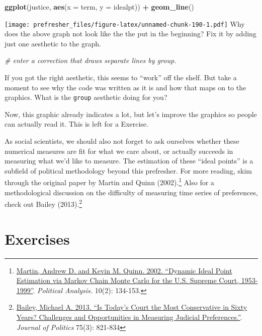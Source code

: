 \documentclass[]{book}
\newenvironment{Shaded}{\begin{snugshade}}{\end{snugshade}}
\newcommand{\CommentTok}[1]{\textcolor[rgb]{0.56,0.35,0.01}{\textit{#1}}}
\newcommand{\DataTypeTok}[1]{\textcolor[rgb]{0.13,0.29,0.53}{#1}}
\newcommand{\KeywordTok}[1]{\textcolor[rgb]{0.13,0.29,0.53}{\textbf{#1}}}
\newcommand{\NormalTok}[1]{#1}
\newcommand{\OperatorTok}[1]{\textcolor[rgb]{0.81,0.36,0.00}{\textbf{#1}}}
\newcommand{\StringTok}[1]{\textcolor[rgb]{0.31,0.60,0.02}{#1}}
\let\rmarkdownfootnote\footnote%
\def\footnote{\protect\rmarkdownfootnote}
\theoremstyle{definition}
\theoremstyle{definition}
\theoremstyle{definition}
\theoremstyle{remark}
\begin{document}
\begin{Shaded}
\begin{Highlighting}[]
\KeywordTok{ggplot}\NormalTok{(justice, }\KeywordTok{aes}\NormalTok{(}\DataTypeTok{x =}\NormalTok{ term, }\DataTypeTok{y =}\NormalTok{ idealpt)) }\OperatorTok{+}
\StringTok{  }\KeywordTok{geom_line}\NormalTok{()}
\end{Highlighting}
\end{Shaded}

\texttt{[image: prefresher\_files/figure-latex/unnamed-chunk-190-1.pdf]}
Why does the above graph not look like the the put in the beginning? Fix it by adding just one aesthetic to the graph.

\begin{Shaded}
\begin{Highlighting}[]
\CommentTok{# enter a correction that draws separate lines by group.}
\end{Highlighting}
\end{Shaded}

If you got the right aesthetic, this seems to ``work'' off the shelf. But take a moment to see why the code was written as it is and how that maps on to the graphics. What is the \texttt{group} aesthetic doing for you?

Now, this graphic already indicates a lot, but let's improve the graphics so people can actually read it. This is left for a Exercise.

As social scientists, we should also not forget to ask ourselves whether these numerical measures are fit for what we care about, or actually succeeds in measuring what we'd like to measure. The estimation of these ``ideal points'' is a subfield of political methodology beyond this prefresher. For more reading, skim through the original paper by Martin and Quinn (2002).\footnote{\href{http://mqscores.lsa.umich.edu/media/pa02.pdf}{Martin, Andrew D. and Kevin M. Quinn. 2002. ``Dynamic Ideal Point Estimation via Markov Chain Monte Carlo for the U.S. Supreme Court, 1953-1999''}. \emph{Political Analysis.} 10(2): 134-153.} Also for a methodological discussion on the difficulty of measuring time series of preferences, check out Bailey (2013).\footnote{\href{https://michaelbailey.georgetown.domains/wp-content/uploads/2018/05/JOP_proofs_June2013.pdf}{Bailey, Michael A. 2013. ``Is Today's Court the Most Conservative in Sixty Years? Challenges and Opportunities in Measuring Judicial Preferences.''}. \emph{Journal of Politics} 75(3): 821-834}

\hypertarget{exercises-2}{%
\section*{Exercises}\label{exercises-2}}
\end{document}
